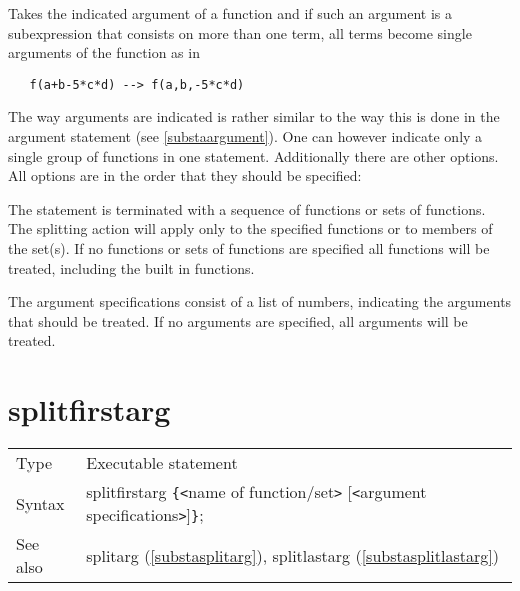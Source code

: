 \noindent Takes the indicated argument of a 
function and if such an argument is a subexpression that consists on more 
than one term, all terms become single arguments of the function as in
\begin{verbatim}
   f(a+b-5*c*d) --> f(a,b,-5*c*d)
\end{verbatim}
The way arguments are indicated is rather similar to the way this is done 
in the argument statement (see 
\ref{substaargument}). One can however indicate only a single group of 
functions in one statement. Additionally there are other options. All 
options are in the order that they should be specified:



\noindent The statement is terminated with a sequence of functions or 
sets of functions. The splitting action will apply only to the 
specified functions or to members of the set(s). If no functions or sets of 
functions are specified all functions will be treated, including the built 
in functions.
 
\noindent The argument specifications consist of a list of numbers, 
indicating the arguments that should be treated. If no arguments are 
specified, all arguments will be treated. \vspace{10mm}


\section{splitfirstarg}
\label{substasplitfirstarg}

\noindent \begin{tabular}{ll}
Type & Executable statement\\
Syntax & splitfirstarg \verb:{:{\tt<}name of function/set{\tt>}
         [{\tt<}argument specifications{\tt>}]\verb:}:;
\\ See also & splitarg (\ref{substasplitarg}),
             splitlastarg (\ref{substasplitlastarg})
\end{tabular}\vspace{4mm}

